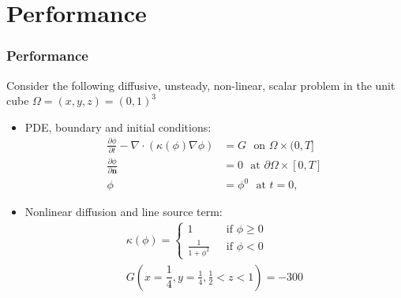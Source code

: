 \documentclass{beamer}
\begin{document}

\section{Performance}

\newcommand{\onehalf}{\frac{1}{2}}
\newcommand{\pder}[2]{\ensuremath{\frac{\partial#1}{\partial#2}}}

\begin{frame}
  \frametitle{Performance}
  Consider the following diffusive, unsteady, non-linear, scalar
  problem in the unit cube $\Omega=(x,y,z)=(0,1)^3$
  \begin{itemize}
  \item PDE, boundary and initial conditions:
    \begin{equation}
      \begin{aligned}
        \pder{\phi}{t}-\nabla \cdot \left(\kappa(\phi)\nabla \phi \right) &= G
        ~~~\text{on $\Omega \times (0,T]$}\\
        \pder{\phi}{\mathbf{n}} &= 0 
        ~~~\text{at $\partial\Omega \times [0,T]$}\\
        \phi &= \phi^0
        ~~~\text{at $t=0$},
      \end{aligned}
    \end{equation}
  \item Nonlinear diffusion and line source term:
    \begin{equation} 
      \begin{aligned}
        \kappa(\phi)=
        \begin{cases}
          1 ~~~&\text{if } \phi \ge 0 \\
          \frac{1}{1+\phi^2} ~~~&\text{if } \phi < 0
        \end{cases}\\
        G(x=\dfrac{1}{4},y=\frac{1}{4},\frac{1}{2}<z<1) = -300
      \end{aligned}
    \end{equation}
  \end{itemize}
\end{frame}
\end{document}
